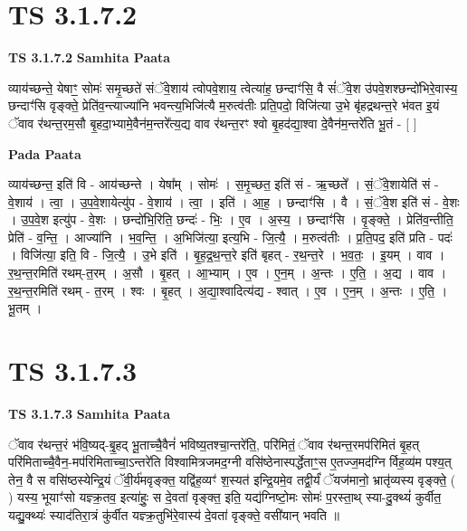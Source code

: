 \documentclass[17pt]{extarticle}
\begin{document}
\section*{ TS 3.1.7.2 }

\textbf{TS 3.1.7.2 } \newline
\textbf{Samhita Paata} \newline

व्याय॑च्छन्ते॒ येषाꣳ॒॒ सोमः॑ समृ॒च्छते॑ संॅवे॒शाय॑ त्वोपवे॒शाय॒ त्वेत्या॑ह॒ छन्दाꣳ॑सि॒ वै सं॑ॅवे॒श उ॑पवे॒शश्छन्दो॑भिरे॒वास्य॒ छन्दाꣳ॑सि वृङ्क्ते॒ प्रेति॑व॒न्त्याज्या॑नि भवन्त्य॒भिजि॑त्यै म॒रुत्व॑तीः प्रति॒पदो॒ विजि॑त्या उ॒भे बृ॑हद्रथन्त॒रे भ॑वत इ॒यं ॅवाव र॑थन्त॒रम॒सौ बृ॒हदा॒भ्यामे॒वैन॑म॒न्तरे᳚त्य॒द्य वाव र॑थन्त॒रꣳ श्वो बृ॒हद॑द्या॒श्वा दे॒वैन॑म॒न्तरे॑ति भू॒तं - [  ] \newline

\textbf{Pada Paata} \newline

व्याय॑च्छन्त॒ इति॑ वि - आय॑च्छन्ते । येषा᳚म् । सोमः॑ । स॒मृ॒च्छत॒ इति॑ सं - ऋ॒च्छते᳚ । सं॒ॅवे॒शायेति॑ सं - वे॒शाय॑ । त्वा॒ । उ॒प॒वे॒शायेत्यु॑प - वे॒शाय॑ । त्वा॒ । इति॑ । आ॒ह॒ । छन्दाꣳ॑सि । वै । सं॒ॅवे॒श इति॑ सं - वे॒शः । उ॒प॒वे॒श इत्यु॑प - वे॒शः । छन्दो॑भि॒रिति॒ छन्दः॑ - भिः॒ । ए॒व । अ॒स्य॒ । छन्दाꣳ॑सि । वृ॒ङ्क्ते॒ । प्रेति॑व॒न्तीति॒ प्रेति॑ - व॒न्ति॒ । आज्या॑नि । भ॒व॒न्ति॒ । अ॒भिजि॑त्या॒ इत्य॒भि - जि॒त्यै॒ । म॒रुत्व॑तीः । प्र॒ति॒पद॒ इति॑ प्रति - पदः॑ । विजि॑त्या॒ इति॒ वि - जि॒त्यै॒ । उ॒भे इति॑ । बृ॒ह॒द्र॒थ॒न्त॒रे इति॑ बृहत् - र॒थ॒न्त॒रे । भ॒व॒तः॒ । इ॒यम् । वाव । र॒थ॒न्त॒रमिति॑ रथम्-त॒रम् । अ॒सौ । बृ॒हत् । आ॒भ्याम् । ए॒व । ए॒न॒म् । अ॒न्तः । ए॒ति॒ । अ॒द्य । वाव । र॒थ॒न्त॒रमिति॑ रथम् - त॒रम् । श्वः । बृ॒हत् । अ॒द्या॒श्वादित्य॑द्य - श्वात् । ए॒व । ए॒न॒म् । अ॒न्तः । ए॒ति॒ । भू॒तम् ।  \newline




\section*{ TS 3.1.7.3 }

\textbf{TS 3.1.7.3 } \newline
\textbf{Samhita Paata} \newline

ॅवाव र॑थन्त॒रं भ॑वि॒ष्यद्-बृ॒॒हद् भू॒ताच्चै॒वैनं॑ भविष्य॒तश्चा॒न्तरे॑ति॒, परि॑मितं॒ ॅवाव र॑थन्त॒रमप॑रिमितं बृ॒हत् परि॑मिताच्चै॒वैन॒-मप॑रिमिताच्चा॒ऽन्तरे॑ति विश्वामित्रजमद॒ग्नी वसि॑ष्ठेनास्पर्द्धेताꣳ॒॒स ए॒तज्ज॒मद॑ग्नि र्विह॒व्य॑म पश्य॒त् तेन॒ वै स वसि॑ष्ठस्येन्द्रि॒यं ॅवी॒र्य॑मवृङ्क्त॒ यद्वि॑ह॒व्यꣳ॑ श॒स्यत॑ इन्द्रि॒यमे॒व तद्वी॒र्यं॑ ॅयज॑मानो॒ भ्रातृ॑व्यस्य वृङ्क्ते॒ ( ) यस्य॒ भूयाꣳ॑सो यज्ञ्क्र॒तव॒ इत्या॑हुः॒ स दे॒वता॑ वृङ्क्त॒ इति॒ यद्य॑ग्निष्टो॒मः सोमः॑ प॒रस्ता॒थ् स्या-दु॒क्थ्यं॑ कुर्वीत॒ यद्यु॒क्थ्यः॑ स्याद॑तिरा॒त्रं कु॑र्वीत यज्ञ्क्र॒तुभि॑रे॒वास्य॑ दे॒वता॑ वृङ्क्ते॒ वसी॑यान् भवति ॥ \newline
\end{document}

